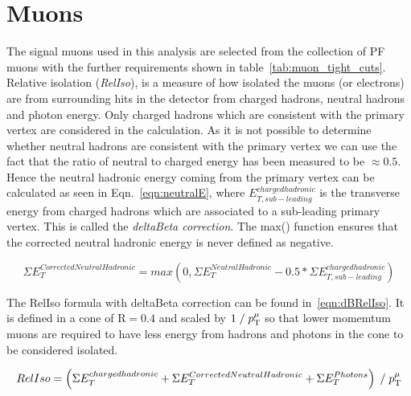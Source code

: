 \section{Muons \label{sec:muonreco}}
The signal muons used in this analysis are selected from the collection of PF muons with the further requirements shown in table~\ref{tab:muon_tight_cuts}.
Relative isolation (\emph{RelIso}), is a measure of how isolated the muons (or electrons) are from surrounding hits in the detector from charged hadrons, neutral hadrons and photon energy. Only charged hadrons which are consistent with the primary vertex are considered in the calculation. As it is not possible to determine whether neutral hadrons are consistent with the primary vertex we can use the fact that the ratio of neutral to charged energy has been measured to be $\approx 0.5$. Hence the neutral hadronic energy coming from the primary vertex can be calculated as seen in Eqn.~\ref{eqn:neutralE}, where $E_{T,sub-leading}^{charged hadronic}$ is the transverse energy from charged hadrons which are associated to a sub-leading primary vertex. This is called the \emph{deltaBeta correction}. The max() function ensures that the corrected neutral hadronic energy is never defined as negative.

\begin{centering}
\begin{equation}
\Sigma E_{T}^{Corrected Neutral Hadronic}  =  max(0, \Sigma E_{T}^{Neutral Hadronic} - 0.5*\Sigma E_{T,sub-leading}^{charged hadronic} )
\label{eqn:neutralE}
\end{equation}
\end{centering}



The RelIso formula with deltaBeta correction can be found in~\ref{eqn:dBRelIso}. It is defined in a cone of $\textrm{R}=0.4$ and scaled by $1\; / \;p_{\mathrm{T}}^{\mu}$ so that lower momemtum muons are required to have less energy from hadrons and photons in the cone to be considered isolated.

\begin{centering}
\begin{equation}
RelIso = \left( \Sigma E_{T}^{charged hadronic} + \Sigma E_{T}^{Corrected Neutral Hadronic} +  \Sigma E_{T}^{Photons} \right) \; / \;   p_{\mathrm{T}}^{\mu}
\label{eqn:dBRelIso}
\end{equation}
\end{centering}


